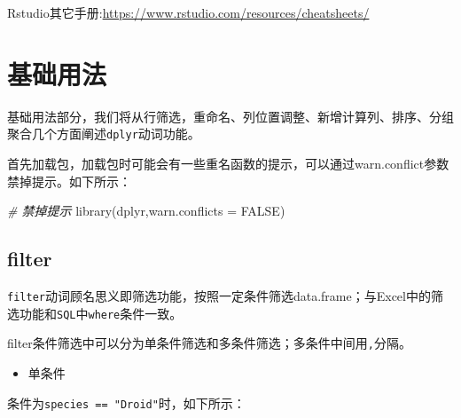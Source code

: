 \documentclass[
]{book}
\newenvironment{Shaded}{\begin{snugshade}}{\end{snugshade}}
\newcommand{\AttributeTok}[1]{\textcolor[rgb]{0.77,0.63,0.00}{#1}}
\newcommand{\CommentTok}[1]{\textcolor[rgb]{0.56,0.35,0.01}{\textit{#1}}}
\newcommand{\ConstantTok}[1]{\textcolor[rgb]{0.00,0.00,0.00}{#1}}
\newcommand{\FunctionTok}[1]{\textcolor[rgb]{0.00,0.00,0.00}{#1}}
\newcommand{\NormalTok}[1]{#1}
\providecommand{\tightlist}{%
  \setlength{\itemsep}{0pt}\setlength{\parskip}{0pt}}
\begin{document}
Rstudio其它手册:\url{https://www.rstudio.com/resources/cheatsheets/}

\hypertarget{dplyr:usage}{%
\section{基础用法}\label{dplyr:usage}}

基础用法部分，我们将从行筛选，重命名、列位置调整、新增计算列、排序、分组聚合几个方面阐述\texttt{dplyr}动词功能。

首先加载包，加载包时可能会有一些重名函数的提示，可以通过warn.conflict参数禁掉提示。如下所示：

\begin{Shaded}
\begin{Highlighting}[]
\CommentTok{\# 禁掉提示}
\FunctionTok{library}\NormalTok{(dplyr,}\AttributeTok{warn.conflicts =} \ConstantTok{FALSE}\NormalTok{)}
\end{Highlighting}
\end{Shaded}

\hypertarget{dplyr-filter}{%
\subsection{filter}\label{dplyr-filter}}

\texttt{filter}动词顾名思义即筛选功能，按照一定条件筛选data.frame；与Excel中的筛选功能和\texttt{SQL}中\texttt{where}条件一致。

filter条件筛选中可以分为单条件筛选和多条件筛选；多条件中间用\texttt{,}分隔。

\begin{itemize}
\tightlist
\item
  单条件
\end{itemize}

条件为\texttt{species\ ==\ "Droid"}时，如下所示：
\end{document}
